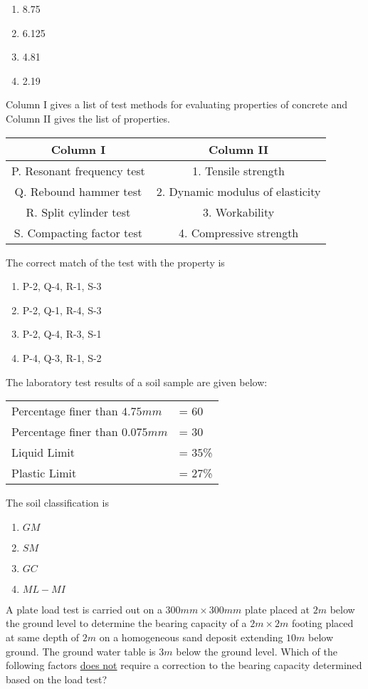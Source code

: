 \begin{enumerate}
    \item 8.75
    \item 6.125
    \item 4.81
    \item 2.19
\end{enumerate}
\item Column I gives a list of test methods for evaluating properties of concrete and Column II gives the list of properties.
\begin{tabular}{|c|c|}
    \hline
    Column I & Column II\\
    \hline
    P. Resonant frequency test & 1. Tensile strength \\
    \hline
    Q. Rebound hammer test & 2. Dynamic modulus of elasticity \\
    \hline
    R. Split cylinder test & 3. Workability \\
    \hline
    S. Compacting factor test & 4. Compressive strength\\
    \hline
\end{tabular}
The correct match of the test with the property is
\begin{enumerate}
    \item P-2, Q-4, R-1, S-3
    \item P-2, Q-1, R-4, S-3
    \item P-2, Q-4, R-3, S-1
    \item P-4, Q-3, R-1, S-2
\end{enumerate}
\item The laboratory test results of a soil sample are given below:
\begin{center}
\begin{tabular}{l l}
    Percentage finer than $4.75 mm$ & = $60$ \\
    Percentage finer than $0.075 mm $& = $30$ \\
    Liquid Limit & = $35$\% \\
    Plastic Limit & = $27$\%
\end{tabular}
\end{center}
The soil classification is
\begin{enumerate}
    \item $GM$
    \item $SM$
    \item $GC$
    \item $ML-MI$
\end{enumerate}
\item A plate load test is carried out on a $300 mm \times 300 mm$ plate placed at $2 m$ below the ground level to determine the bearing capacity of a $2 m\times 2 m$ footing placed at same depth of $2 m$ on a homogeneous sand deposit extending $10 m$ below ground. The ground water table is $3 m$ below the ground level. Which of the following factors \underline{does not} require a correction to the bearing capacity determined based on the load test?
